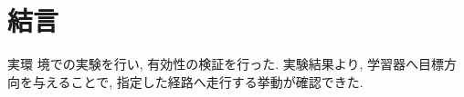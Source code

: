 \documentclass[10pt]{jarticle}
\begin{document}
    
    
    
        
    \section{結\hspace{2zw}言}%
    
    実環
    境での実験を行い, 有効性の検証を行った. 実験結果より, 学習器へ目標方向を与えることで,
    指定した経路へ走行する挙動が確認できた.
    
\end{document}
